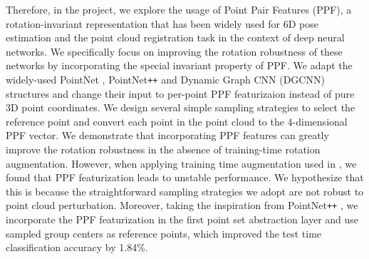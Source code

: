 \documentclass{article}
\begin{document}
Therefore, in the project, we explore the usage of Point Pair Features (PPF), a rotation-invariant representation that has been widely used for 6D pose estimation and the point cloud registration task in the context of deep neural networks. We specifically focus on improving the rotation robustness of these networks by incorporating the special invariant property of PPF. 
We adapt the widely-used PointNet \cite{Qi2017pointnet}, PointNet\texttt{++} \cite{qi2017pointnet2} and Dynamic Graph CNN (DGCNN) \cite{Wang2019-dgcnn} structures and change their input to per-point PPF featurizaion instead of pure 3D point coordinates. 
We design several simple sampling strategies to select the reference point and convert each point in the point cloud to the 4-dimensional PPF vector. We demonstrate that incorporating PPF features can greatly improve the rotation robustness in the absence of training-time rotation augmentation. 
However, when applying training time augmentation used in \cite{qi2017pointnet2}, we found that PPF featurization leads to unstable performance. We hypothesize that this is because the straightforward sampling strategies we adopt are not robust to point cloud perturbation.
Moreover, taking the inspiration from PointNet\texttt{++} \cite{qi2017pointnet2}, we incorporate the PPF featurization in the first point set abstraction layer and use sampled group centers as reference points, which improved the test time classification accuracy by 1.84\%.


\end{document}
